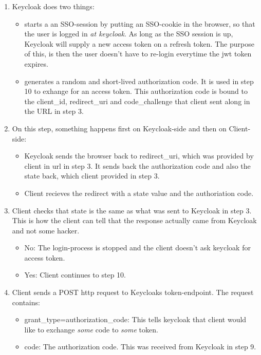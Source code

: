 \documentclass[a4paper,11pt]{article}
\begin{document}
\begin{enumerate}
\begin{itemize}
        \end{itemize}
    \item Keycloak does two things:
        \begin{itemize}
            \item starts a an SSO-session by putting an SSO-cookie in the browser, so that the user is logged in \textit{at keycloak}. As long as the SSO session is up, Keycloak will supply a new access token on a refresh token. The purpose of this, is then the user doesn't have to re-login everytime the jwt token expires.
            \item generates a random and short-lived authorization code. It is used in step 10 to exhange for an access token. This authorization code is bound to the client\_id, redirect\_uri and code\_challenge that client sent along in the URL in step 3.
        \end{itemize}
    \item On this step, something happens first on Keycloak-side and then on Client-side:
        \begin{itemize}
            \item Keycloak sends the browser back to redirect\_uri, which was provided by client in url in step 3. It sends back the authorization code and also the state back, which client provided in step 3.
            \item Client recieves the redirect with a state value and the authoriation code.
        \end{itemize}
    \item Client checks that state is the same as what was sent to Keycloak in step 3. This is how the client can tell that the response actually came from Keycloak and not some hacker.
        \begin{itemize}
            \item No: The login-process is stopped and the client doesn't ask keycloak for access token.
            \item Yes: Client continues to step 10.
        \end{itemize}
    \item Client sends a POST http request to Keycloaks token-endpoint. The request contains:
        \begin{itemize}
            \item grant\_type=authorization\_code: This tells keycloak that client would like to exchange \textit{some} code to \textit{some} token.
            \item code: The authorization code. This was received from Keycloak in step 9.

\end{itemize}
\end{enumerate}
\end{document}
